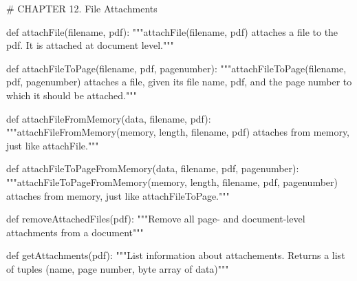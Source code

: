 # CHAPTER 12. File Attachments

def attachFile(filename, pdf):
    """attachFile(filename, pdf) attaches a file to the pdf. It is attached at
    document level."""

def attachFileToPage(filename, pdf, pagenumber):
    """attachFileToPage(filename, pdf, pagenumber) attaches a file, given its
    file name, pdf, and the page number to which it should be attached."""

def attachFileFromMemory(data, filename, pdf):
    """attachFileFromMemory(memory, length, filename, pdf) attaches from
    memory, just like attachFile."""

def attachFileToPageFromMemory(data, filename, pdf, pagenumber):
    """attachFileToPageFromMemory(memory, length, filename, pdf, pagenumber)
    attaches from memory, just like attachFileToPage."""

def removeAttachedFiles(pdf):
    """Remove all page- and document-level attachments from a document"""

def getAttachments(pdf):
    """List information about attachements. Returns a list of tuples
    (name, page number, byte array of data)"""
